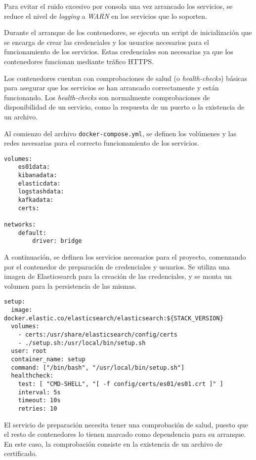 Para evitar el ruido excesivo por consola una vez arrancado los servicios, se
reduce el nivel de \textit{logging} a \textit{WARN} en los servicios que lo
soporten.

Durante el arranque de los contenedores, se ejecuta un script de inicialización
que se encarga de crear las credenciales y los usuarios necesarios para el
funcionamiento de los servicios. Estas credenciales son necesarias ya que los
contenedores funcionan mediante tráfico HTTPS.

Los contenedores cuentan con comprobaciones de salud (o \textit{health-checks})
básicas para asegurar que los servicios se han arrancado correctamente y están
funcionando. Los \textit{health-checks} son normalmente comprobaciones de
disponibilidad de un servicio, como la respuesta de un puerto o la existencia de
un archivo.

Al comienzo del archivo \texttt{docker-compose.yml}, se definen los volúmenes y
las redes necesarias para el correcto funcionamiento de los servicios.

\begin{lstlisting}[style=yaml, caption={Definición de volúmenes y redes en Docker Compose}]
volumes:
	es01data:
	kibanadata:
	elasticdata:
	logstashdata:
	kafkadata:
	certs:

networks:
	default:
		driver: bridge
\end{lstlisting}

A continuación, se definen los servicios necesarios para el proyecto, comenzando
por el contenedor de preparación de credenciales y usuarios. Se utiliza una
imagen de Elasticsearch para la creación de las credenciales, y se monta un
volumen para la persistencia de las mismas.

\begin{lstlisting}[style=yaml, caption={Definición del servicio de preparación}]
setup:
  image: docker.elastic.co/elasticsearch/elasticsearch:${STACK_VERSION}
  volumes:
    - certs:/usr/share/elasticsearch/config/certs
    - ./setup.sh:/usr/local/bin/setup.sh
  user: root
  container_name: setup
  command: ["/bin/bash", "/usr/local/bin/setup.sh"]
  healthcheck:
    test: [ "CMD-SHELL", "[ -f config/certs/es01/es01.crt ]" ]
    interval: 5s
    timeout: 10s
    retries: 10
\end{lstlisting}

El servicio de preparación necesita tener una comprobación de salud, puesto que
el resto de contenedores lo tienen marcado como dependencia para su arranque. En
este caso, la comprobación consiste en la existencia de un archivo de
certificado.


